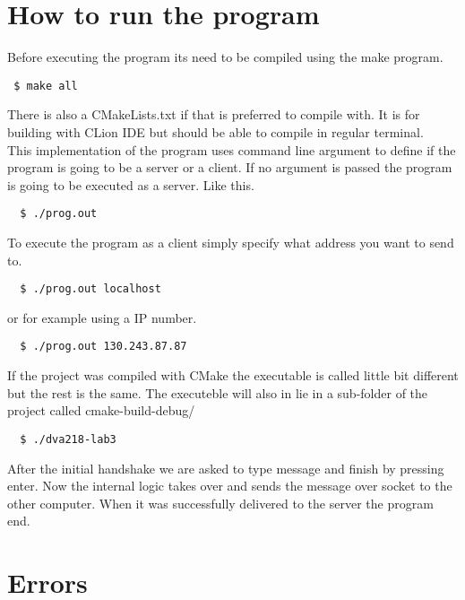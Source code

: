 
\section{How to run the program}

Before executing the program its need to be compiled using the make program.

\begin{lstlisting}
 $ make all
\end{lstlisting}

There is also a CMakeLists.txt if that is preferred to compile with. It is for building with CLion IDE but should be able to compile in regular terminal.\\

This implementation of the program uses command line argument to define if the program is going to be a server or a client. If no argument is passed the program is going to be executed as a server. Like this.

\begin{lstlisting}
  $ ./prog.out
\end{lstlisting}

To execute the program as a client simply specify what address you want to send to.
\begin{lstlisting}
  $ ./prog.out localhost
\end{lstlisting}

or for example using a IP number. 
\begin{lstlisting}
  $ ./prog.out 130.243.87.87
\end{lstlisting}
 
If the project was compiled with CMake the executable is called little bit different but the rest is the same. The executeble will also in lie in a sub-folder of the project called cmake-build-debug/
\begin{lstlisting}
  $ ./dva218-lab3
\end{lstlisting}


After the initial handshake we are asked to type message and finish by pressing enter. Now the internal logic takes over and sends the message over socket to the other computer. When it was successfully delivered to the server the program end.

\section{Errors}
